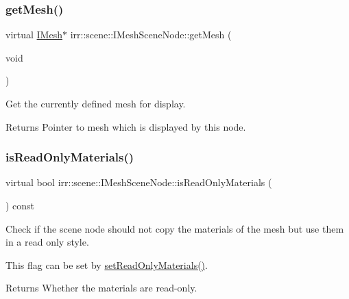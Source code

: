 \subsubsection{\texorpdfstring{get\+Mesh()}{getMesh()}}
{\footnotesize\ttfamily virtual \hyperlink{classirr_1_1scene_1_1IMesh}{I\+Mesh}$\ast$ irr\+::scene\+::\+I\+Mesh\+Scene\+Node\+::get\+Mesh (\begin{DoxyParamCaption}\item[{void}]{ }\end{DoxyParamCaption})\hspace{0.3cm}{\ttfamily [pure virtual]}}



Get the currently defined mesh for display. 

\begin{DoxyReturn}{Returns}
Pointer to mesh which is displayed by this node. 
\end{DoxyReturn}
\mbox{\label{classirr_1_1scene_1_1IMeshSceneNode_a1d7de4331b84480598f636c929418e3d}} 
\subsubsection{\texorpdfstring{is\+Read\+Only\+Materials()}{isReadOnlyMaterials()}}
{\footnotesize\ttfamily virtual bool irr\+::scene\+::\+I\+Mesh\+Scene\+Node\+::is\+Read\+Only\+Materials (\begin{DoxyParamCaption}{ }\end{DoxyParamCaption}) const\hspace{0.3cm}{\ttfamily [pure virtual]}}



Check if the scene node should not copy the materials of the mesh but use them in a read only style. 

This flag can be set by \hyperlink{classirr_1_1scene_1_1IMeshSceneNode_a3bae73b4f7b1a6b265a62ece964c008f}{set\+Read\+Only\+Materials()}. \begin{DoxyReturn}{Returns}
Whether the materials are read-\/only. 
\end{DoxyReturn}
\mbox{\label{classirr_1_1scene_1_1IMeshSceneNode_a8d7e98ddfb990bfc354c9c410a4d788f}} 
